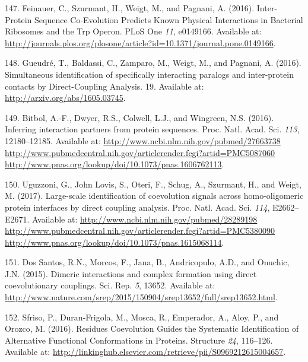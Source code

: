 \documentclass[11pt,a4paper,twoside]{book}
\theoremstyle{definition}
\theoremstyle{definition}
\theoremstyle{remark}
\begin{document}
\hypertarget{ref-Feinauer2016a}{}
147. Feinauer, C., Szurmant, H., Weigt, M., and Pagnani, A. (2016).
Inter-Protein Sequence Co-Evolution Predicts Known Physical Interactions
in Bacterial Ribosomes and the Trp Operon. PLoS One \emph{11}, e0149166.
Available at:
\url{http://journals.plos.org/plosone/article?id=10.1371/journal.pone.0149166}.

\hypertarget{ref-Gueudre2016}{}
148. Gueudré, T., Baldassi, C., Zamparo, M., Weigt, M., and Pagnani, A.
(2016). Simultaneous identification of specifically interacting paralogs
and inter-protein contacts by Direct-Coupling Analysis. 19. Available
at: \url{http://arxiv.org/abs/1605.03745}.

\hypertarget{ref-Bitbol2016}{}
149. Bitbol, A.-F., Dwyer, R.S., Colwell, L.J., and Wingreen, N.S.
(2016). Inferring interaction partners from protein sequences. Proc.
Natl. Acad. Sci. \emph{113}, 12180--12185. Available at:
\href{http://www.ncbi.nlm.nih.gov/pubmed/27663738\%20http://www.pubmedcentral.nih.gov/articlerender.fcgi?artid=PMC5087060\%20http://www.pnas.org/lookup/doi/10.1073/pnas.1606762113}{http://www.ncbi.nlm.nih.gov/pubmed/27663738 http://www.pubmedcentral.nih.gov/articlerender.fcgi?artid=PMC5087060 http://www.pnas.org/lookup/doi/10.1073/pnas.1606762113}.

\hypertarget{ref-Uguzzoni2017}{}
150. Uguzzoni, G., John Lovis, S., Oteri, F., Schug, A., Szurmant, H.,
and Weigt, M. (2017). Large-scale identification of coevolution signals
across homo-oligomeric protein interfaces by direct coupling analysis.
Proc. Natl. Acad. Sci. \emph{114}, E2662--E2671. Available at:
\href{http://www.ncbi.nlm.nih.gov/pubmed/28289198\%20http://www.pubmedcentral.nih.gov/articlerender.fcgi?artid=PMC5380090\%20http://www.pnas.org/lookup/doi/10.1073/pnas.1615068114}{http://www.ncbi.nlm.nih.gov/pubmed/28289198 http://www.pubmedcentral.nih.gov/articlerender.fcgi?artid=PMC5380090 http://www.pnas.org/lookup/doi/10.1073/pnas.1615068114}.

\hypertarget{ref-DosSantos2015a}{}
151. Dos Santos, R.N., Morcos, F., Jana, B., Andricopulo, A.D., and
Onuchic, J.N. (2015). Dimeric interactions and complex formation using
direct coevolutionary couplings. Sci. Rep. \emph{5}, 13652. Available
at:
\url{http://www.nature.com/srep/2015/150904/srep13652/full/srep13652.html}.

\hypertarget{ref-Sfriso2016}{}
152. Sfriso, P., Duran-Frigola, M., Mosca, R., Emperador, A., Aloy, P.,
and Orozco, M. (2016). Residues Coevolution Guides the Systematic
Identification of Alternative Functional Conformations in Proteins.
Structure \emph{24}, 116--126. Available at:
\url{http://linkinghub.elsevier.com/retrieve/pii/S0969212615004657}.
\end{document}
